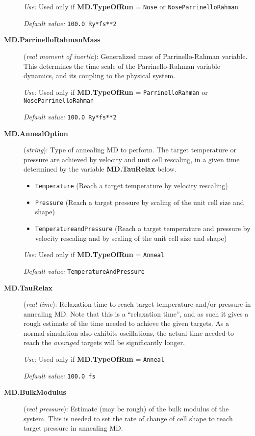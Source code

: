 \documentclass[11pt]{article}
\begin{document}
\begin{description}
{\it Use:} Used only if {\bf MD.TypeOfRun} = {\tt Nose} or 
{\tt NoseParrinelloRahman}

{\it Default value:} {\tt 100.0 Ry*fs**2}

\item[{\bf MD.ParrinelloRahmanMass}] ({\it real moment of inertia}): 
Generalized mass of Parrinello-Rahman variable.
This determines the time scale 
of the Parrinello-Rahman variable
dynamics, and its coupling to
the physical system.

{\it Use:} Used only if {\bf MD.TypeOfRun} = {\tt ParrinelloRahman} 
or {\tt NoseParrinelloRahman}

{\it Default value:} {\tt 100.0 Ry*fs**2}

\item[{\bf MD.AnnealOption}] ({\it string}): 
Type of annealing MD to perform. The target temperature or pressure are
achieved by velocity and unit cell rescaling, 
in a given time determined by the variable
{\bf MD.TauRelax} below.
\begin{itemize}
\item {\tt Temperature} (Reach a target temperature by velocity rescaling)
\item {\tt Pressure} (Reach a target pressure by scaling of the unit
cell size and shape)
\item {\tt TemperatureandPressure}  (Reach a target temperature 
and pressure by velocity rescaling and by scaling of the unit
cell size and shape)
\end{itemize}

{\it Use:} Used only if {\bf MD.TypeOfRun} = {\tt Anneal}

{\it Default value:} {\tt TemperatureAndPressure}

\item[{\bf MD.TauRelax}] ({\it real time}): 
Relaxation time to reach target temperature
and/or pressure in annealing MD. Note that this is a ``relaxation
time'', and as such it gives a rough estimate of the time needed to
achieve the given targets. As a normal simulation also exhibits
oscillations, the actual time needed to reach the {\it averaged}
targets will be significantly longer.

{\it Use:} Used only if {\bf MD.TypeOfRun} = {\tt Anneal}

{\it Default value:} {\tt 100.0 fs}

\item[{\bf MD.BulkModulus}] ({\it real pressure}): 
Estimate (may be rough) of the bulk modulus of the system.
This is needed to set the rate of change of cell shape
to reach target pressure in annealing MD.


\end{description}
\end{document}
